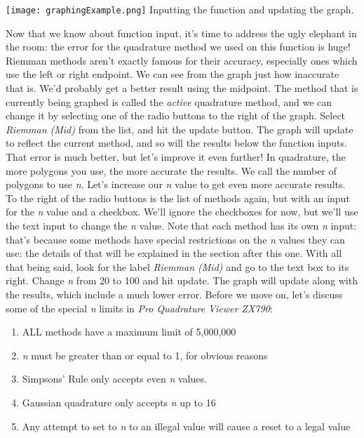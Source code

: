 \documentclass[12pt]{article}
\newcommand{\newLine}{\vspace{5mm}}
\newcommand{\appname}{\textit{Pro Quadrature Viewer ZX790}}
\begin{document}
\begin{center}
\texttt{[image: graphingExample.png]}
\small Inputting the function and updating the graph.
\normalsize
\end{center}

\newLine Now that we know about function input, it's time to address the ugly elephant in the room: the error for the quadrature method we used on this function is huge! Riemman methods aren't exactly famous for their accuracy, especially ones which use the left or right endpoint. We can see from the graph just how inaccurate that is. We'd probably get a better result using the midpoint. The method that is currently being graphed is called the \emph{active} quadrature method, and we can change it by selecting one of the radio buttons to the right of the graph. Select \emph{Riemman (Mid)} from the list, and hit the update button. The graph will update to reflect the current method, and so will the results below the function inputs. That error is much better, but let's improve it even further! In quadrature, the more polygons you use, the more accurate the results. We call the number of polygons to use \emph{n}. Let's increase our \emph{n} value to get even more accurate results. To the right of the radio buttons is the list of methods again, but with an input for the \emph{n} value and a checkbox. We'll ignore the checkboxes for now, but we'll use the text input to change the \emph{n} value. Note that each method has its own \emph{n} input: that's because some methods have special restrictions on the \emph{n} values they can use: the details of that will be explained in the section after this one. With all that being said, look for the label \emph{Riemman (Mid)} and go to the text box to its right. Change \emph{n} from 20 to 100 and hit update. The graph will update along with the results, which include a much lower error. Before we move on, let's discuss some of the special \emph{n} limits in \appname :
\begin{enumerate}[\indent 1.]
\item ALL methods have a maximum limit of 5,000,000
\item \emph{n} must be greater than or equal to 1, for obvious reasons
\item Simpsons' Rule only accepts even \emph{n} values.
\item Gaussian quadrature only accepts \emph{n} up to 16
\item Any attempt to set to \emph{n} to an illegal value will cause a reset to a legal value
\end{enumerate}
\end{document}
